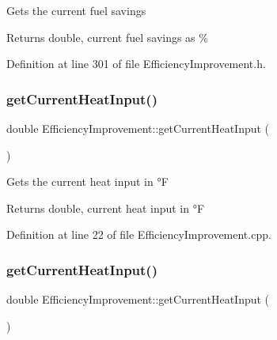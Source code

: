 Gets the current fuel savings

\begin{DoxyReturn}{Returns}
double, current fuel savings as \% 
\end{DoxyReturn}


Definition at line 301 of file Efficiency\+Improvement.\+h.

\mbox{\label{class_efficiency_improvement_af43c4706cb5cd67ce58e9c4356e4564c}} 
\subsubsection{\texorpdfstring{get\+Current\+Heat\+Input()}{getCurrentHeatInput()}\hspace{0.1cm}{\footnotesize\ttfamily [1/3]}}
{\footnotesize\ttfamily double Efficiency\+Improvement\+::get\+Current\+Heat\+Input (\begin{DoxyParamCaption}{ }\end{DoxyParamCaption})}

Gets the current heat input in °F

\begin{DoxyReturn}{Returns}
double, current heat input in °F 
\end{DoxyReturn}


Definition at line 22 of file Efficiency\+Improvement.\+cpp.

\mbox{\label{class_efficiency_improvement_af43c4706cb5cd67ce58e9c4356e4564c}} 
\subsubsection{\texorpdfstring{get\+Current\+Heat\+Input()}{getCurrentHeatInput()}\hspace{0.1cm}{\footnotesize\ttfamily [2/3]}}
{\footnotesize\ttfamily double Efficiency\+Improvement\+::get\+Current\+Heat\+Input (\begin{DoxyParamCaption}{ }\end{DoxyParamCaption})}

